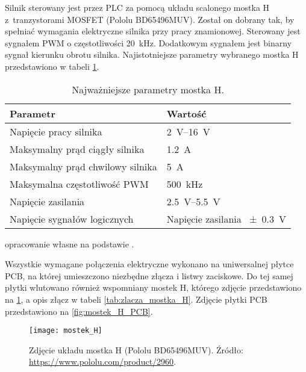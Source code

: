 Silnik sterowany jest przez PLC za pomocą układu scalonego mostka H z~tranzystorami MOSFET (Pololu BD65496MUV). Został on dobrany tak, by spełniać wymagania elektryczne silnika przy pracy znamionowej. Sterowany jest sygnałem PWM o częstotliwości \SI{20}{\kilo\hertz}. Dodatkowym sygnałem jest binarny sygnał kierunku obrotu silnika. Najistotniejsze parametry wybranego mostka H przedstawiono w tabeli \ref{tab:parametry_mostka_H}.

\begin{table}[H]
    \centering
    \begin{threeparttable}
        \caption{Najważniejsze parametry mostka H.}
        \label{tab:parametry_mostka_H}
        
        \begin{tabularx}{0.7\textwidth}{l | l}
            \toprule
            Parametr & Wartość \\
            \midrule
            Napięcie pracy silnika & \SIrange{2}{16}{\volt} \\
            Maksymalny prąd ciągły silnika & \SI{1,2}{\ampere} \\
            Maksymalny prąd chwilowy silnika & \SI{5}{\ampere} \\
            Maksymalna częstotliwość PWM & \SI{500}{\kilo\hertz} \\
            Napięcie zasilania & \SIrange{2,5}{5,5}{\volt} \\
            Napięcie sygnałów logicznych & Napięcie zasilania \SI{+-0,3}{\volt} \\
            \bottomrule
        \end{tabularx}
        
        \begin{tablenotes}
            \footnotesize
            \item[a] opracowanie własne na podstawie \cite{MOSTEK_H_MANUAL}.
        \end{tablenotes}
    \end{threeparttable}
\end{table}

Wszystkie wymagane połączenia elektryczne wykonano na uniwersalnej płytce PCB, na której umieszczono niezbędne złącza i listwy zaciskowe. Do tej samej płytki wlutowano również wspomniany mostek H, którego zdjęcie przedstawiono na \cref{fig:zdjecie_mostka_H}, a opis złącz w tabeli \ref{tab:zlacza_mostka_H}. Zdjęcie płytki PCB przedstawiono na \cref{fig:mostek_H_PCB}.

\begin{figure}[h]
    \centering
    \texttt{[image: mostek\_H]}
    \caption{Zdjęcie układu mostka H (Pololu BD65496MUV). Źródło: \url{https://www.pololu.com/product/2960}.}
    \label{fig:zdjecie_mostka_H}
\end{figure}

